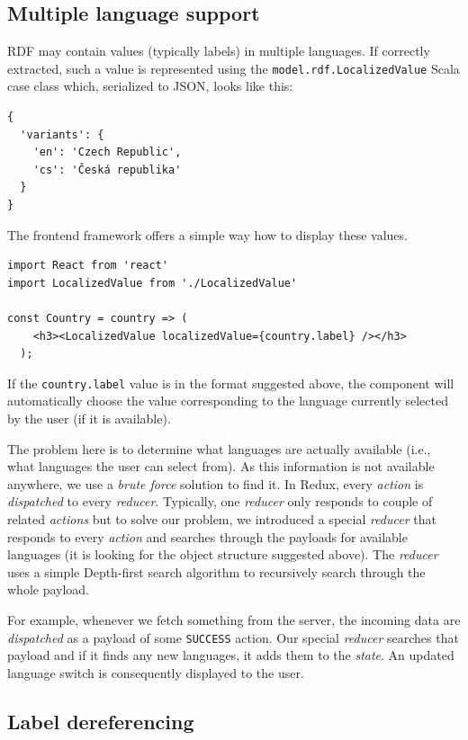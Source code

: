 \subsection{Multiple language support}

RDF may contain values (typically labels) in multiple languages. If correctly extracted, such a value is represented using the \texttt{model.rdf.LocalizedValue} Scala case class which, serialized to JSON, looks like this:

\begin{verbatim}
{
  'variants': {
    'en': 'Czech Republic',
    'cs': 'Česká republika'
  }
}
\end{verbatim}

The frontend framework offers a simple way how to display these values.

\begin{verbatim}
import React from 'react'
import LocalizedValue from './LocalizedValue'

const Country = country => (
    <h3><LocalizedValue localizedValue={country.label} /></h3>
  );
\end{verbatim}

If the \texttt{country.label} value is in the format suggested above, the component will automatically choose the value corresponding to the language currently selected by the user (if it is available).

The problem here is to determine what languages are actually available (i.e., what languages the user can select from). As this information is not available anywhere, we use a \emph{brute force} solution to find it. In Redux, every \emph{action} is \emph{dispatched} to every \emph{reducer}. Typically, one \emph{reducer} only responds to couple of related \emph{actions} but to solve our problem, we introduced a special \emph{reducer} that responds to every \emph{action} and searches through the payloads for available languages (it is looking for the object structure suggested above). The \emph{reducer} uses a simple Depth-first search algorithm to recursively search through the whole payload.

For example, whenever we fetch something from the server, the incoming data are \emph{dispatched} as a payload of some \texttt{SUCCESS} action. Our special \emph{reducer} searches that payload and if it finds any new languages, it adds them to the \emph{state}. An updated language switch is consequently displayed to the user.

\subsection{Label dereferencing}

